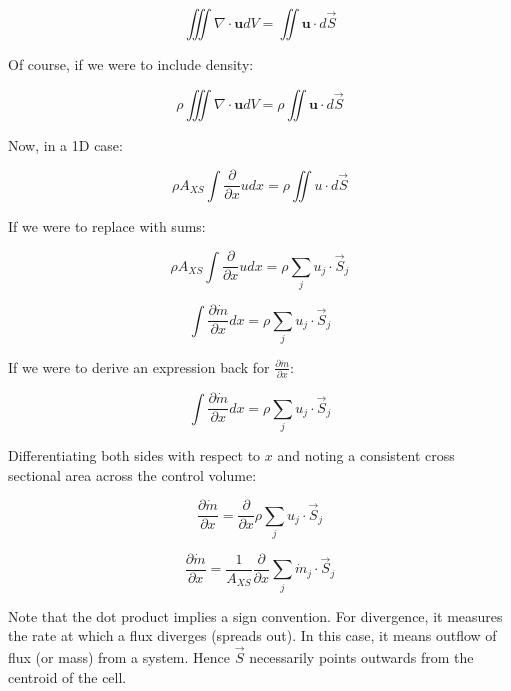 \documentclass[masters]{ucbthesis}
\renewcommand{\_}{\kern-1.5pt\textunderscore\kern-1.5pt}
\begin{document}
\begin{equation*}
	\iiint \nabla \cdot \mathbf{u} dV = \iint \mathbf{u} \cdot d \vec{S}
\end{equation*}

Of course, if we were to include density:

\begin{equation*}
	\rho \iiint \nabla \cdot \mathbf{u} dV = \rho \iint \mathbf{u} \cdot d \vec{S}
\end{equation*}

Now, in a 1D case:

\begin{equation*}
	\rho A_{XS} \int \frac{\partial}{\partial x} u dx = \rho \iint u \cdot d \vec{S}
\end{equation*}

If we were to replace with sums:


\begin{equation*}
	\rho A_{XS} \int \frac{\partial}{\partial x} u dx 
	= \rho \sum_j u_j \cdot \vec{S}_j
\end{equation*}


\begin{equation*}
	\int \frac{\partial \dot{m}}{\partial x}  dx 
	= \rho \sum_j u_j \cdot \vec{S}_j
\end{equation*}

If we were to derive an expression back for 
$\frac{\partial \dot{m}}{\partial x}$:

\begin{equation*}
	\int \frac{\partial \dot{m}}{\partial x}  dx 
	= \rho \sum_j u_j \cdot \vec{S}_j
\end{equation*}

Differentiating both sides with respect to $x$ and noting a consistent 
cross sectional area across the control volume:

\begin{equation*}
	\frac{\partial \dot{m}}{\partial x}  
	= \frac{\partial }{\partial x} \rho \sum_j u_j \cdot \vec{S}_j
\end{equation*}


\begin{equation*}
	\frac{\partial \dot{m}}{\partial x}  
	= \frac{1}{A_{XS}} \frac{\partial }{\partial x} \sum_j \dot{m}_j \cdot \vec{S}_j
\end{equation*}

Note that the dot product implies a sign convention. For divergence, 
it measures the rate at which a flux diverges (spreads out). In this case,
it means outflow of flux (or mass) from a system. Hence $\vec{S}$ necessarily 
points outwards from the centroid of the cell.
\end{document}
